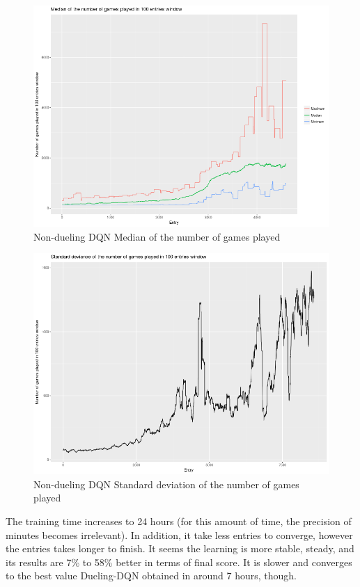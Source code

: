 \documentclass[11pt,twoside,a4paper]{article}
\begin{document}
\begin{figure}[H]
  \includegraphics[scale=0.35]{log-analysis/dqn-nd-median-ngp.png}
  \centering
  \caption{Non-dueling DQN Median of the number of games played}
  \label{fig:dqn-nd-median-ngp}
\end{figure}

\begin{figure}[H]
  \includegraphics[scale=0.35]{log-analysis/dqn-nd-sd-ngp.png}
  \centering
  \caption{Non-dueling DQN Standard deviation of the number of games played}
  \label{fig:dqn-nd-sd-ngp}
\end{figure}

The training time increases to 24 hours (for this amount of time, the precision
of minutes becomes irrelevant). In addition, it take less entries to converge,
however the entries takes longer to finish. It seems the learning is more
stable, steady, and its results are 7\% to 58\% better in terms of final score.
It is slower and converges to the best value Dueling-DQN obtained in around 7
hours, though.
\end{document}
